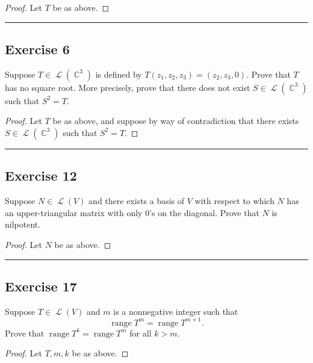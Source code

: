 \documentclass[letterpaper, 12pt]{amsart}
\DeclareMathOperator{\C}{\mathbb{C}}				%
\DeclareMathOperator{\Ell}{\mathscr{L}}				%
\DeclareMathOperator{\range}{\text{range }}			%
\theoremstyle{definition}  							%
\begin{document}
		\begin{proof}
		Let $T$ be as above.
		\end{proof}
		\vspace*{2mm}
		\hrule
		\vspace*{2mm}

		\subsection*{Exercise 6}
		Suppose $T \in \Ell(\C^3)$ is defined by $T(z_{1}, z_{2}, z_{3}) = (z_{2},z_{3},0)$. 
		Prove that $T$ has no square root. 
		More precisely, prove that there does not exist $S \in \Ell(\C^3)$ such that $S^2=T$.

		\begin{proof}
		Let $T$ be as above, and suppose by way of contradiction that there exists $S \in \Ell(\C^3)$ such that $S^2=T$.
		\end{proof}
		\vspace*{2mm}
		\hrule
		\vspace*{2mm}

		\subsection*{Exercise 12}
		Suppose $N \in \Ell(V)$ and there exists a basis of $V$ with respect to which $N$ has an upper-triangular matrix with only $0$'s on the diagonal. 
		Prove that $N$ is nilpotent.

		\begin{proof}
		Let $N$ be as above.
		\end{proof}
		\vspace*{2mm}
		\hrule
		\vspace*{2mm}

		\subsection*{Exercise 17}
		Suppose $T \in \Ell(V)$ and $m$ is a nonnegative integer such that $$\range T^{m} = \range T^{m+1}.$$
		Prove that $\range T^k = \range T^m$ for all $k > m$.

		\begin{proof}
		Let $T,m,k$ be as above.
		\end{proof}
\end{document}
